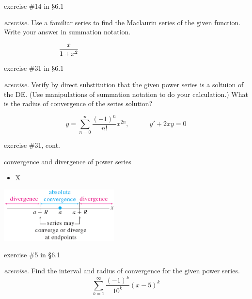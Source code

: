 \documentclass[urlcolor=blue,dvipsnames]{beamer}
\begin{document}
\begin{frame}{exercise \#14 in \S 6.1}

\noindent \emph{exercise.}  Use a familiar series to find the Maclaurin series of the given function.  Write your answer in summation notation.

$$\frac{x}{1+x^2} \hspace{60mm}$$

\vspace{60mm}
\end{frame}


\begin{frame}{exercise \#31 in \S 6.1}

\noindent \emph{exercise.}  Verify by direct substitution that the given power series is a soltuion of the DE.  (Use manipulations of summation notation to do your calculation.)  What is the radius of convergence of the series solution?

$$y=\sum_{n=0}^\infty \frac{(-1)^n}{n!} x^{2n}, \qquad\quad y'+2xy=0$$

\vspace{60mm}
\end{frame}


\begin{frame}{exercise \#31, cont.}

\end{frame}


\begin{frame}{convergence and divergence of power series}

\begin{itemize}
\item X
\end{itemize}

\hfill \includegraphics[width=0.45\textwidth]{figs/convergediverge}
\end{frame}


\begin{frame}{exercise \#5 in \S 6.1}

\noindent \emph{exercise.}  Find the interval and radius of convergence for the given power series.
    $$\sum_{k=1}^\infty \frac{(-1)^k}{10^k} (x-5)^k$$

\vspace{60mm}
\end{frame}
\end{document}
